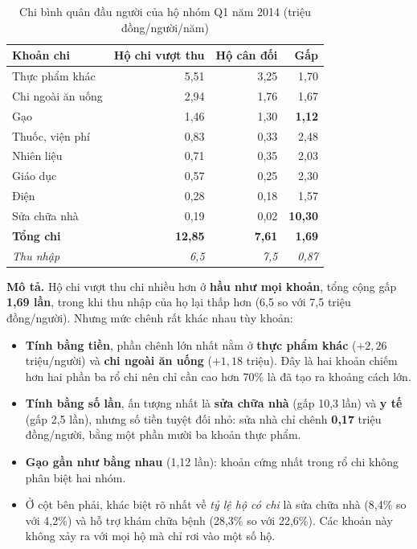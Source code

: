 \documentclass[11pt,a4paper]{article}
\newcommand{\n}[1]{\textbf{#1}}
\begin{document}
\begin{table}[H]\centering\small
\caption{Chi bình quân đầu người của hộ nhóm Q1 năm 2014 (triệu đồng/người/năm)}
\begin{tabular}{lrrr}
\toprule
Khoản chi & Hộ chi vượt thu & Hộ cân đối & Gấp\\
\midrule
Thực phẩm khác & 5,51 & 3,25 & 1,70\\
Chi ngoài ăn uống & 2,94 & 1,76 & 1,67\\
Gạo & 1,46 & 1,30 & \textbf{1,12}\\
Thuốc, viện phí & 0,83 & 0,33 & 2,48\\
Nhiên liệu & 0,71 & 0,35 & 2,03\\
Giáo dục & 0,57 & 0,25 & 2,30\\
Điện & 0,28 & 0,18 & 1,57\\
Sửa chữa nhà & 0,19 & 0,02 & \textbf{10,30}\\
\midrule
\textbf{Tổng chi} & \textbf{12,85} & \textbf{7,61} & \textbf{1,69}\\
\textit{Thu nhập} & \textit{6,5} & \textit{7,5} & \textit{0,87}\\
\bottomrule
\end{tabular}
\end{table}

\textbf{Mô tả.} Hộ chi vượt thu chi nhiều hơn ở \n{hầu như mọi khoản}, tổng cộng gấp \n{1,69 lần}, trong khi thu nhập của họ lại thấp hơn (6,5 so với 7,5 triệu đồng/người). Nhưng mức chênh rất khác nhau tùy khoản:

\begin{itemize}[leftmargin=1.3em,itemsep=3pt,topsep=2pt]
\item \n{Tính bằng tiền}, phần chênh lớn nhất nằm ở \n{thực phẩm khác} ($+2{,}26$ triệu/người) và \n{chi ngoài ăn uống} ($+1{,}18$ triệu). Đây là hai khoản chiếm hơn hai phần ba rổ chi nên chỉ cần cao hơn 70\% là đã tạo ra khoảng cách lớn.
\item \n{Tính bằng số lần}, ấn tượng nhất là \n{sửa chữa nhà} (gấp 10,3 lần) và \n{y tế} (gấp 2,5 lần), nhưng số tiền tuyệt đối nhỏ: sửa nhà chỉ chênh \n{0,17} triệu đồng/người, bằng một phần mười ba khoản thực phẩm.
\item \n{Gạo gần như bằng nhau} (1,12 lần): khoản cứng nhất trong rổ chi không phân biệt hai nhóm.
\item Ở cột bên phải, khác biệt rõ nhất về \emph{tỷ lệ hộ có chi} là sửa chữa nhà (8,4\% so với 4,2\%) và hỗ trợ khám chữa bệnh (28,3\% so với 22,6\%). Các khoản này không xảy ra với mọi hộ mà chỉ rơi vào một số hộ.
\end{itemize}
\end{document}
